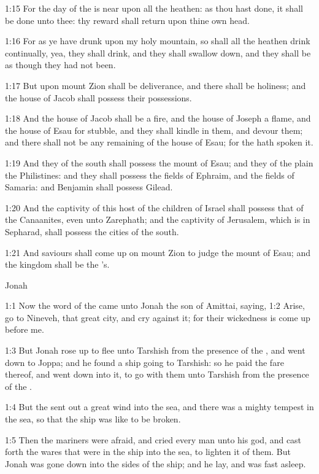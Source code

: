 1:15 For the day of the \LORD is near upon all the heathen: as thou
hast done, it shall be done unto thee: thy reward shall return upon
thine own head.

1:16 For as ye have drunk upon my holy mountain, so shall all the
heathen drink continually, yea, they shall drink, and they shall
swallow down, and they shall be as though they had not been.

1:17 But upon mount Zion shall be deliverance, and there shall be
holiness; and the house of Jacob shall possess their possessions.

1:18 And the house of Jacob shall be a fire, and the house of Joseph a
flame, and the house of Esau for stubble, and they shall kindle in
them, and devour them; and there shall not be any remaining of the
house of Esau; for the \LORD hath spoken it.

1:19 And they of the south shall possess the mount of Esau; and they
of the plain the Philistines: and they shall possess the fields of
Ephraim, and the fields of Samaria: and Benjamin shall possess Gilead.

1:20 And the captivity of this host of the children of Israel shall
possess that of the Canaanites, even unto Zarephath; and the captivity
of Jerusalem, which is in Sepharad, shall possess the cities of the
south.

1:21 And saviours shall come up on mount Zion to judge the mount of
Esau; and the kingdom shall be the \LORD's.




Jonah


1:1 Now the word of the \LORD came unto Jonah the son of Amittai,
saying, 1:2 Arise, go to Nineveh, that great city, and cry against it;
for their wickedness is come up before me.

1:3 But Jonah rose up to flee unto Tarshish from the presence of the
\LORD, and went down to Joppa; and he found a ship going to Tarshish:
so he paid the fare thereof, and went down into it, to go with them
unto Tarshish from the presence of the \LORD.

1:4 But the \LORD sent out a great wind into the sea, and there was a
mighty tempest in the sea, so that the ship was like to be broken.

1:5 Then the mariners were afraid, and cried every man unto his god,
and cast forth the wares that were in the ship into the sea, to
lighten it of them. But Jonah was gone down into the sides of the
ship; and he lay, and was fast asleep.

